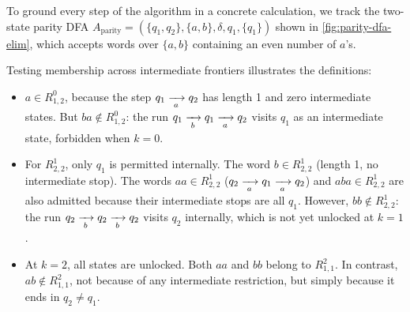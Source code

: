 \begin{example}
\label{ex:parity-dfa-state-elim}
To ground every step of the algorithm in a concrete calculation, we track the two-state parity DFA $A_{\mathrm{parity}} = (\{q_1, q_2\}, \{a, b\}, \delta, q_1, \{q_1\})$ shown in \cref{fig:parity-dfa-elim}, which accepts words over $\{a, b\}$ containing an even number of $a$'s.

\noindent
\begin{minipage}{\linewidth}
\centering
{}
\label{fig:parity-dfa-elim}
\end{minipage}

\noindent
Testing membership across intermediate frontiers illustrates the definitions:
\begin{itemize}[leftmargin=1.2em, nosep]
  \item $a \in R_{1,2}^0$, because the step $q_1 \xrightarrow[{\;a\;}]{} q_2$ has length 1 and zero intermediate states. But $ba \notin R_{1,2}^0$: the run $q_1 \xrightarrow[{\;b\;}]{} q_1 \xrightarrow[{\;a\;}]{} q_2$ visits $q_1$ as an intermediate state, forbidden when $k=0$.
  \item For $R_{2,2}^1$, only $q_1$ is permitted internally. The word $b \in R_{2,2}^1$ (length 1, no intermediate stop). The words $aa \in R_{2,2}^1$ ($q_2 \xrightarrow[{\;a\;}]{} q_1 \xrightarrow[{\;a\;}]{} q_2$) and $aba \in R_{2,2}^1$ are also admitted because their intermediate stops are all $q_1$. However, $bb \notin R_{2,2}^1$: the run $q_2 \xrightarrow[{\;b\;}]{} q_2 \xrightarrow[{\;b\;}]{} q_2$ visits $q_2$ internally, which is not yet unlocked at $k=1$.
  \item At $k=2$, all states are unlocked. Both $aa$ and $bb$ belong to $R_{1,1}^2$. In contrast, $ab \notin R_{1,1}^2$, not because of any intermediate restriction, but simply because it ends in $q_2 \neq q_1$.
\end{itemize}
\end{example}

